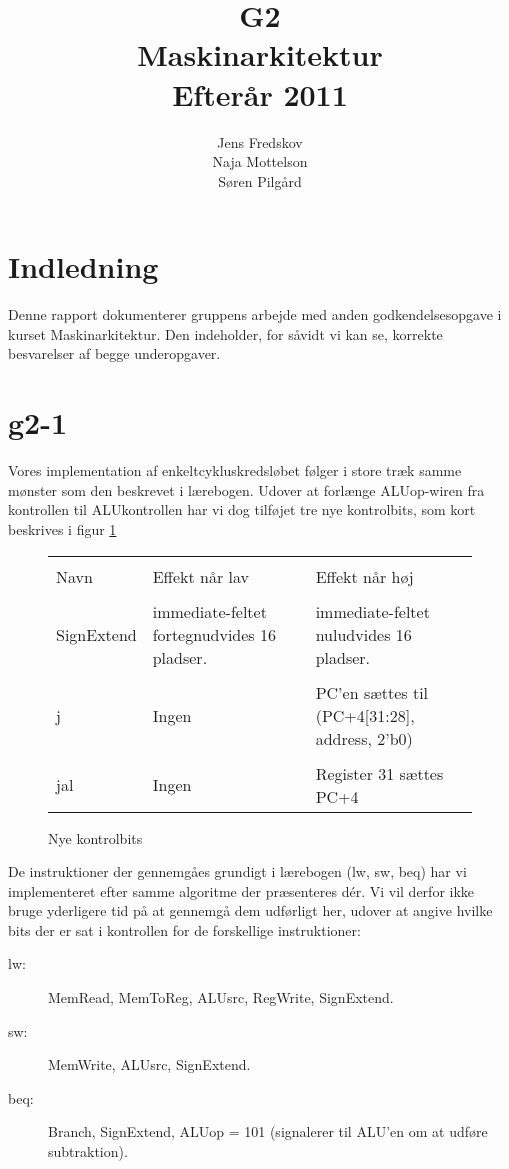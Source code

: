 \documentclass[10pt,a4paper,danish]{article}
\title{G2\\Maskinarkitektur\\Efterår 2011}
\author{Jens Fredskov\\ Naja Mottelson\\Søren Pilgård}
\begin{document}
\maketitle
\newpage

\tableofcontents
\newpage

\section{Indledning}
Denne rapport dokumenterer gruppens arbejde med anden godkendelsesopgave i
kurset Maskinarkitektur. Den indeholder, for såvidt vi kan se, korrekte
besvarelser af begge underopgaver. 

\section{g2-1}
Vores implementation af enkeltcykluskredsløbet følger i store træk samme mønster
som den beskrevet i lærebogen. Udover at forlænge ALUop-wiren fra kontrollen til
ALUkontrollen har vi dog tilføjet tre nye kontrolbits, som kort beskrives i
figur \ref{fig:newcontrols}

\begin{figure}[htb]
  \begin{tabular}{| l | p{5cm} | p{5cm} |}
    \hline\\
    Navn & Effekt når lav & Effekt når høj\\ 
    \hline\\
    SignExtend & immediate-feltet fortegnudvides 16 pladser. & immediate-feltet nuludvides 16 pladser.\\
    \hline\\
    j & Ingen & PC'en sættes til (PC+4[31:28], address, 2'b0) \\
    \hline\\
    jal & Ingen & Register 31 sættes PC+4\\
    \hline
  \end{tabular}
  \caption{Nye kontrolbits}
  \label{fig:newcontrols}
\end{figure}

De instruktioner der gennemgåes grundigt i lærebogen (lw, sw, beq) har vi
implementeret efter samme algoritme der præsenteres dér. Vi vil derfor ikke
bruge yderligere tid på at gennemgå dem udførligt her, udover at angive hvilke
bits der er sat i kontrollen for de forskellige instruktioner: 

\begin{description}
\item[lw:] MemRead, MemToReg, ALUsrc, RegWrite, SignExtend.
\item[sw:] MemWrite, ALUsrc, SignExtend.
\item[beq:] Branch, SignExtend, ALUop = 101 (signalerer til ALU'en om at udføre subtraktion).
\end{description}
\end{document}
